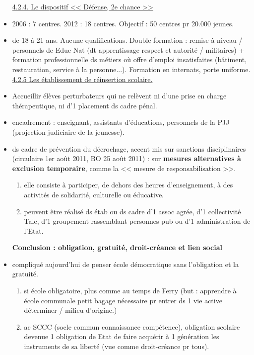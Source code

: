 \documentclass[12pt]{report}
\begin{document}
\begin{itemize}
\underline{4.2.4. Le dispositif << Défense, 2e chance >>} \\

\item 2006 : 7 centres. 2012 : 18 centres. Objectif : 50 centres pr 20.000 jeunes.\\

\item de 18 à 21 ans. Aucune qualifications. Double formation : remise à niveau / personnels de Educ Nat (dt apprentissage respect et autorité / militaires) + formation professionnelle ds métiers où offre d'emploi insatisfaites (bâtiment, restauration, service à la personne...). Formation en internats, porte uniforme.\\

\underline{4.2.5 Les établissement de réinsertion scolaire.} \\

\item Accueillir élèves perturbateurs qui ne relèvent ni d'une prise en charge thérapeutique, ni d'1 placement ds cadre pénal.\\

\item encadrement : enseignant, assistants d'éducations, personnels de la PJJ (projection judiciaire de la jeunesse). \\

\item ds cadre de prévention du décrochage, accent mis sur sanctions disciplinaires (circulaire 1er août 2011, BO 25 août 2011) : sur \textbf{mesures alternatives à exclusion temporaire}, comme la << mesure de responsabilisation >>.\\
\begin{enumerate}
\item elle consiste à participer, de dehors des heures d'enseignement, à des activités de solidarité, culturelle ou éducative.\\
\item peuvent être réalisé ds étab ou ds cadre d'1 assoc agrée, d'1 collectivité Tale, d'1 groupement rassemblant personnes pub ou d'1 administration de l'Etat.\\
\end{enumerate}

\textbf{Conclusion : obligation, gratuité, droit-créance et lien social} \\

\item compliqué aujourd'hui de penser école démocratique sans l'obligation et la gratuité.
\begin{enumerate}
\item  si école obligatoire, plus comme au temps de Ferry (but : apprendre à école communale petit bagage nécessaire pr entrer ds 1 vie active déterminer / milieu d'origine.) \\
\item ac SCCC (socle commun connaissance compétence), obligation scolaire devenue 1 obligation de Etat de faire acquérir à 1 génération les instruments de sa liberté (vue comme droit-créance pr tous). \\
\end{enumerate}


\end{itemize}
\end{document}
